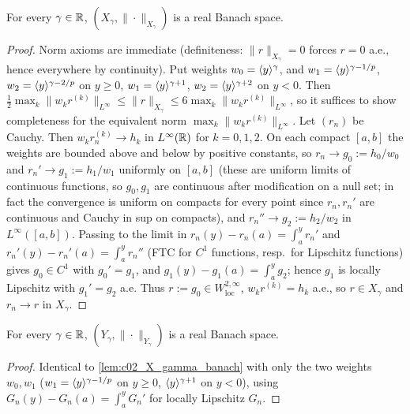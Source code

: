 \begin{lemma}
  \label{lem:c02_X_gamma_banach}
  For every $\gamma\in\mathbb{R}$, $(X_\gamma,\|\cdot\|_{X_\gamma})$ is a real Banach space.
\end{lemma}
\begin{proof}
  Norm axioms are immediate (definiteness: $\|r\|_{X_\gamma}=0$ forces $r=0$ a.e., hence
  everywhere by continuity). Put weights $w_0=\langle y \rangle^\gamma$, and
  $w_1=\langle y \rangle^{\gamma-1/p}$, $w_2=\langle y \rangle^{\gamma-2/p}$ on $y\ge0$,
  $w_1=\langle y \rangle^{\gamma+1}$, $w_2=\langle y \rangle^{\gamma+2}$ on $y<0$. Then
  $\frac12\max_k\|w_kr^{(k)}\|_{L^\infty}\le\|r\|_{X_\gamma}\le 6\max_k\|w_kr^{(k)}\|_{L^\infty}$, so
  it suffices to show completeness for the equivalent norm $\max_k\|w_kr^{(k)}\|_{L^\infty}$.
  Let $(r_n)$ be Cauchy. Then $w_kr_n^{(k)}\to h_k$ in $L^\infty(\mathbb{R})$ for $k=0,1,2$.
  On each compact $[a,b]$ the weights are bounded above and below by positive constants, so
  $r_n\to g_0:=h_0/w_0$ and $r_n'\to g_1:=h_1/w_1$ uniformly on $[a,b]$ (these are uniform limits of
  continuous functions, so $g_0,g_1$ are continuous after modification on a null set; in fact the
  convergence is uniform on compacts for every point since $r_n,r_n'$ are continuous and
  Cauchy in sup on compacts), and $r_n''\to g_2:=h_2/w_2$ in $L^\infty([a,b])$.
  Passing to the limit in $r_n(y)-r_n(a)=\int_a^yr_n'$ and $r_n'(y)-r_n'(a)=\int_a^y r_n''$
  (FTC for $C^1$ functions, resp.\ for Lipschitz functions) gives $g_0\in C^1$ with $g_0'=g_1$, and
  $g_1(y)-g_1(a)=\int_a^yg_2$; hence $g_1$ is locally Lipschitz with $g_1'=g_2$ a.e.
  Thus $r:=g_0\in W^{2,\infty}_{\mathrm{loc}}$, $w_kr^{(k)}=h_k$ a.e., so $r\in X_\gamma$ and
  $r_n\to r$ in $X_\gamma$.
\end{proof}

\begin{lemma}
  \label{lem:c02_Y_gamma_banach}
  For every $\gamma\in\mathbb{R}$, $(Y_\gamma,\|\cdot\|_{Y_\gamma})$ is a real Banach space.
\end{lemma}
\begin{proof}
  Identical to \cref{lem:c02_X_gamma_banach} with only the two weights $w_0,w_1$
  ($w_1=\langle y \rangle^{\gamma-1/p}$ on $y\ge0$, $\langle y \rangle^{\gamma+1}$ on $y<0$), using
  $G_n(y)-G_n(a)=\int_a^y G_n'$ for locally Lipschitz $G_n$.
\end{proof}

